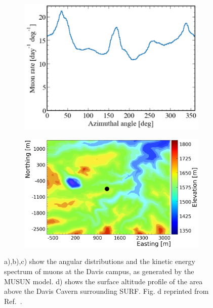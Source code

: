 \begin{figure}[ht!]
\begin{subfigure}[b]{0.49\textwidth}
        \includegraphics[width=\textwidth]{figures/Muons/Azimuthal.pdf}
        \caption{}
        \label{fig:Muons/azi}
    \end{subfigure}
    \begin{subfigure}[b]{0.49\textwidth}   
        \centering 
        \includegraphics[width=\textwidth]{figures/Muons/SurfMapTrimmed.png}
        \caption{} 
        \label{fig:Muons/SurfaceProfile}
    \end{subfigure}
    \caption{a),b),c) show the angular distributions and the kinetic energy spectrum of muons at the Davis campus, as generated by the MUSUN model. d) shows the surface altitude profile of the area above the Davis Cavern surrounding SURF. Fig. d reprinted from Ref.~\cite{LZ_SIMS}.} 
    \label{fig:Muons/Prime_info}
\end{figure}

